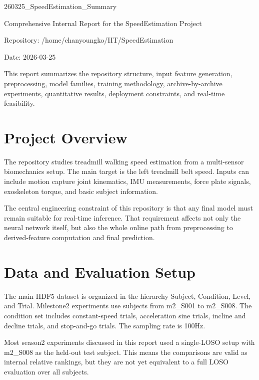 \documentclass[11pt,a4paper]{article}
\begin{document}
\begin{titlepage}
\centering
{\LARGE 260325\_SpeedEstimation\_Summary\par}
\vspace{1.2cm}
{\Large Comprehensive Internal Report for the SpeedEstimation Project\par}
\vspace{1.0cm}
{\large Repository: /home/chanyoungko/IIT/SpeedEstimation\par}
\vspace{0.6cm}
{\large Date: 2026-03-25\par}
\vfill
{\large This report summarizes the repository structure, input feature generation, preprocessing, model families, training methodology, archive-by-archive experiments, quantitative results, deployment constraints, and real-time feasibility.\par}
\vfill
\end{titlepage}

\tableofcontents
\clearpage

\section{Project Overview}

The repository studies treadmill walking speed estimation from a multi-sensor biomechanics setup. The main target is the left treadmill belt speed. Inputs can include motion capture joint kinematics, IMU measurements, force plate signals, exoskeleton torque, and basic subject information.

The central engineering constraint of this repository is that any final model must remain suitable for real-time inference. That requirement affects not only the neural network itself, but also the whole online path from preprocessing to derived-feature computation and final prediction.

\section{Data and Evaluation Setup}

The main HDF5 dataset is organized in the hierarchy Subject, Condition, Level, and Trial. Milestone2 experiments use subjects from m2\_S001 to m2\_S008. The condition set includes constant-speed trials, acceleration sine trials, incline and decline trials, and stop-and-go trials. The sampling rate is 100Hz.

Most season2 experiments discussed in this report used a single-LOSO setup with m2\_S008 as the held-out test subject. This means the comparisons are valid as internal relative rankings, but they are not yet equivalent to a full LOSO evaluation over all subjects.
\end{document}
